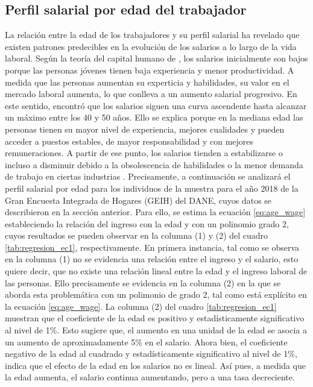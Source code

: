 \documentclass[12pt,a4paper,onecolumn]{article}
\begin{document}
\subsection{Perfil salarial por edad del trabajador}

La relación entre la edad de los trabajadores y su perfil salarial ha revelado que existen patrones predecibles en la evolución de los salarios a lo largo de la vida laboral. Según la teoría del capital humano de \cite{becker1964}, los salarios inicialmente son bajos porque las personas jóvenes tienen baja experiencia y menor productividad. A medida que las personas aumentan su experticia y habilidades, su valor en el mercado laboral aumenta, lo que conlleva a un aumento salarial progresivo.
\bigbreak
En este sentido, \cite{mincer1974} encontró que los salarios siguen una curva ascendente hasta alcanzar un máximo entre los 40 y 50 años. Ello se explica porque en la mediana edad las personas tienen su mayor nivel de experiencia, mejores cualidades y pueden acceder a puestos estables, de mayor responsabilidad y con mejores remuneraciones. A partir de ese punto, los salarios tienden a estabilizarse o incluso a disminuir debido a la obsolescencia de habilidades o la menor demanda de trabajo en ciertas industrias \citep{juhn1993}.
\bigbreak
Precisamente, a continuación se analizará el perfil salarial por edad para los individuos de la muestra para el año 2018 de la Gran Encuesta Integrada de Hogares (GEIH) del DANE, cuyos datos se describieron en la sección anterior. Para ello, se estima la ecuación \ref{eq:age_wage} estableciendo la relación del ingreso con la edad y con un polinomio grado 2, cuyos resultados se pueden observar en la columna (1) y (2) del cuadro \ref{tab:regresion_ec1}, respectivamente.
\bigbreak
En primera instancia, tal como se observa en la columna (1) no se evidencia una relación entre el ingreso y el salario, esto quiere decir, que no existe una relación lineal entre la edad y el ingreso laboral de las personas. Ello precisamente se evidencia en la columna (2) en la que se aborda esta problemática con un polimonio de grado 2, tal como está explícito en la ecuación \ref{eq:age_wage}.
\bigbreak
La columna (2) del cuadro \ref{tab:regresion_ec1} muestran que el coeficiente de la edad es positivo y estadísticamente significativo al nivel de 1\%. Esto sugiere que, el aumento en una unidad de la edad se asocia a un aumento de aproximadamente 5\% en el salario. Ahora bien, el coeficiente negativo de la edad al cuadrado y estadísticamente significativo al nivel de 1\%, indica que el efecto de la edad en los salarios no es lineal. Así pues, a medida que la edad aumenta, el salario continua aumentando, pero a una tasa decreciente. 
\bigbreak
\end{document}
